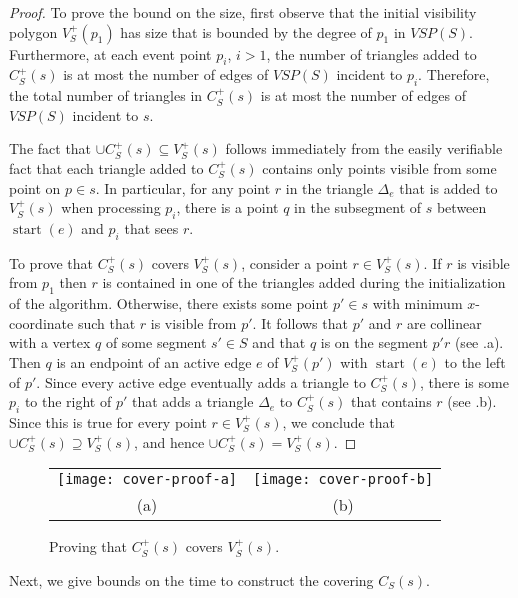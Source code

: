 \documentclass{patmorin}
\newcommand{\VSP}{\mathit{VSP}}
\DeclareMathOperator{\start}{start}
\begin{document}
\begin{proof}
To prove the bound on the size, first observe that the initial visibility
polygon $V^+_S(p_1)$ has size that is bounded by the degree of $p_1$ in
$\VSP(S)$.  Furthermore, at each event point $p_i$, $i>1$, the number of
triangles added to $C^+_S(s)$ is at most the number of edges of $\VSP(S)$
incident to $p_i$.  Therefore, the total number of triangles in $C^+_S(s)$
is at most the number of edges of $\VSP(S)$ incident to $s$.

The fact that $\cup C^+_S(s)\subseteq V^+_S(s)$ follows immediately from
the easily verifiable fact that each triangle added to $C^+_S(s)$ contains
only points visible from some point on $p\in s$.  In particular, for any
point $r$ in the triangle $\Delta_e$ that is added to $V^+_S(s)$ when
processing $p_i$, there is a point $q$ in the subsegment of $s$ between
$\start(e)$ and $p_i$ that sees $r$.

To prove that $C^+_S(s)$ covers $V^+_S(s)$, consider a point $r\in
V^+_S(s)$.  If $r$ is visible from $p_1$ then $r$ is contained in
one of the triangles added during the initialization of the algorithm.
Otherwise, there exists some point $p'\in s$ with minimum $x$-coordinate
such that $r$ is visible from $p'$.  It follows that $p'$ and $r$
are collinear with a vertex $q$ of some segment $s'\in S$ and that $q$
is on the segment $p'r$ (see .a).  Then $q$ is an
endpoint of an active edge $e$ of $V^+_S(p')$ with $\start(e)$ to the
left of $p'$.  Since every active edge eventually adds a triangle to
$C^+_S(s)$, there is some $p_i$ to the right of $p'$ that adds a triangle
$\Delta_e$ to $C^+_S(s)$ that contains $r$ (see .b).
Since this is true for every point $r\in V^+_S(s)$, we conclude that
$\cup C^+_S(s)\supseteq V^+_S(s)$, and hence $\cup C^+_S(s)= V^+_S(s)$.
\end{proof}

\begin{figure}
  \begin{center}
    \begin{tabular}{cc}
      \texttt{[image: cover-proof-a]} &
      \texttt{[image: cover-proof-b]} \\
      (a) & (b)
    \end{tabular}
  \end{center}
  \caption{Proving that $C^+_S(s)$ covers $V^+_S(s)$.}
\end{figure}

Next, we give bounds on the time to construct the covering $C_S(s)$.
\end{document}

